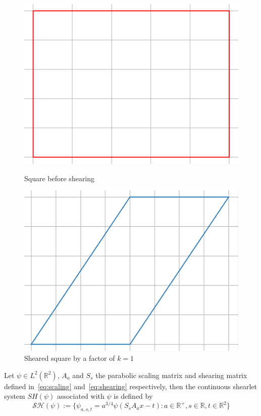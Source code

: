 \begin{figure}[!tbp]
  \centering
  \begin{minipage}[b]{0.45\textwidth}
    \includegraphics[width=\textwidth]{./Diagrams/square.png}
    \caption{Square before shearing}
  \end{minipage}
  \hfill
  \begin{minipage}[b]{0.45\textwidth}
    \includegraphics[width=\textwidth]{./Diagrams/square_sheared.png}
    \caption{Sheared square by a factor of $k=1$}
  \end{minipage}
\end{figure}


\begin{defn}
Let $\psi\in L^2(\mathbb{R}^2)$, $A_a$ and $S_s$ the parabolic scaling matrix and shearing matrix defined in~\ref{eq:scaling} and~\ref{eq:shearing} respectively, then the continuous shearlet system $SH(\psi)$ associated with $\psi$ is defined by
\begin{equation}
\label{eq:contshearletsys}
\mathcal{SH}(\psi):=\{\psi_{a,s,t}=a^{3/4}\psi (S_sA_ax-t):a\in\mathbb{R}^+,s\in\mathbb{R},t\in\mathbb{R}^2\}
\end{equation}
\end{defn}


